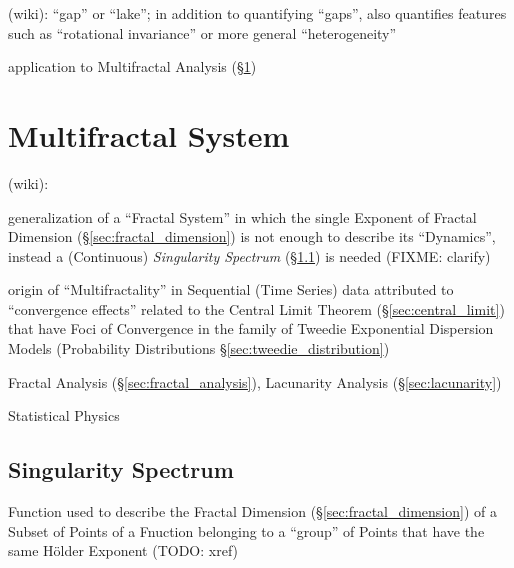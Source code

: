 (wiki): ``gap'' or ``lake''; in addition to quantifying ``gaps'', also
quantifies features such as ``rotational invariance'' or more general
``heterogeneity''

application to Multifractal Analysis (\S\ref{sec:multifractal_system})



\section{Multifractal System}\label{sec:multifractal_system}

(wiki):

generalization of a ``Fractal System'' in which the single Exponent of Fractal
Dimension (\S\ref{sec:fractal_dimension}) is not enough to describe its
``Dynamics'',  instead a (Continuous) \emph{Singularity Spectrum}
(\S\ref{sec:singularity_spectrum}) is needed (FIXME: clarify)

origin of ``Multifractality'' in Sequential (Time Series) data attributed to
``convergence effects'' related to the Central Limit Theorem
(\S\ref{sec:central_limit}) that have Foci of Convergence in the family of
Tweedie Exponential Dispersion Models (Probability Distributions
\S\ref{sec:tweedie_distribution})

Fractal Analysis (\S\ref{sec:fractal_analysis}), Lacunarity Analysis
(\S\ref{sec:lacunarity})

Statistical Physics



\subsection{Singularity Spectrum}\label{sec:singularity_spectrum}

Function used to describe the Fractal Dimension (\S\ref{sec:fractal_dimension})
of a Subset of Points of a Fnuction belonging to a ``group'' of Points that have
the same H\"older Exponent (TODO: xref)

